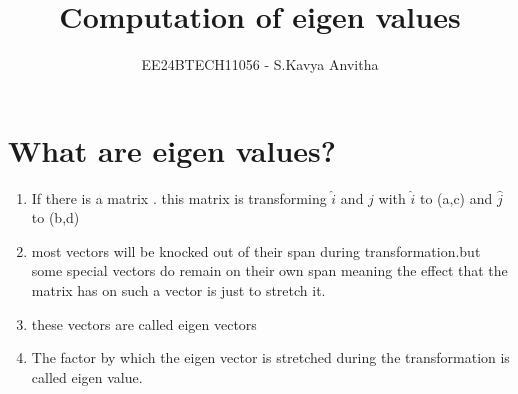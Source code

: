 \documentclass[journal]{IEEEtran}
\begin{document}

\vspace{3cm}

\title{Computation of eigen values}
\author{EE24BTECH11056 - S.Kavya Anvitha}
{\let\newpage\relax\maketitle}

\renewcommand{\thefigure}{\theenumi}
\renewcommand{\thetable}{\theenumi}
\setlength{\intextsep}{10pt} %


\renewcommand{\thetable}{\theenumi}
\section{\textbf{What are eigen values?}}
\begin{enumerate}
\item If there is a matrix . this matrix is transforming $\hat{i}$ and $\hat{j}$ with $\hat{i}$ to (a,c) and $\hat{j}$ to (b,d)
\item most vectors will be knocked out of their span during transformation.but some special vectors do remain on their own span meaning the effect that the matrix has on such a vector is just to stretch it.
\item these vectors are called eigen vectors
\item The factor by which the eigen vector is stretched during the transformation is called eigen value.  
\end{enumerate}
\end{document}
